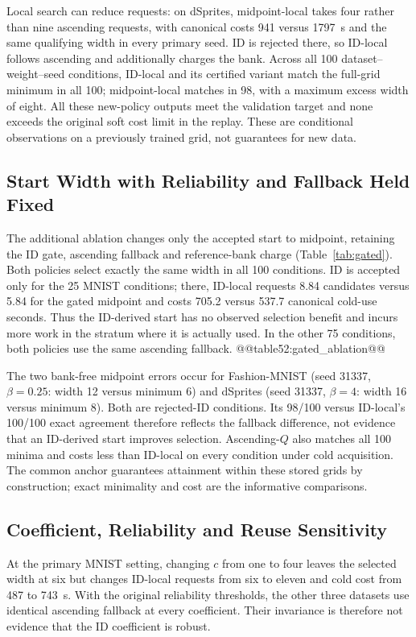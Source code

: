 Local search can reduce requests: on dSprites, midpoint-local takes
four rather than nine ascending requests, with canonical costs 941
versus 1797~s and the same qualifying width in every primary seed.
ID is rejected there, so ID-local follows ascending and additionally
charges the bank. Across all 100 dataset--weight--seed conditions,
ID-local and its certified variant match the full-grid minimum in all
100; midpoint-local matches in 98, with a maximum excess width of eight.
All these new-policy outputs meet the validation target and none exceeds
the original soft cost limit in the replay. These are conditional
observations on a previously trained grid, not guarantees for new data.

\subsection{Start Width with Reliability and Fallback Held Fixed}\label{sec:gated}
The additional ablation changes only the accepted start to midpoint,
retaining the ID gate, ascending fallback and reference-bank charge
(Table~\ref{tab:gated}). Both policies select exactly the same width
in all 100 conditions. ID is accepted only for the 25 MNIST conditions;
there, ID-local requests 8.84 candidates versus 5.84 for the gated
midpoint and costs 705.2 versus 537.7 canonical cold-use seconds.
Thus the ID-derived start has no observed selection benefit and incurs
more work in the stratum where it is actually used. In the other 75
conditions, both policies use the same ascending fallback.
@@table52:gated_ablation@@

The two bank-free midpoint errors occur for Fashion-MNIST
(seed 31337, $\beta=0.25$: width 12 versus minimum 6) and dSprites
(seed 31337, $\beta=4$: width 16 versus minimum 8). Both are rejected-ID
conditions. Its 98/100 versus ID-local's 100/100 exact agreement therefore
reflects the fallback difference, not evidence that an ID-derived start
improves selection. Ascending-$Q$ also matches all 100 minima and costs
less than ID-local on every condition under cold acquisition. The common
anchor guarantees attainment within these stored grids by construction;
exact minimality and cost are the informative comparisons.

\subsection{Coefficient, Reliability and Reuse Sensitivity}\label{sec:idsensitivity}
At the primary MNIST setting, changing $c$ from one to four leaves the
selected width at six but changes ID-local requests from six to eleven
and cold cost from 487 to 743~s. With the original reliability thresholds,
the other three datasets use identical ascending fallback at every
coefficient. Their invariance is therefore not evidence that the ID
coefficient is robust.

